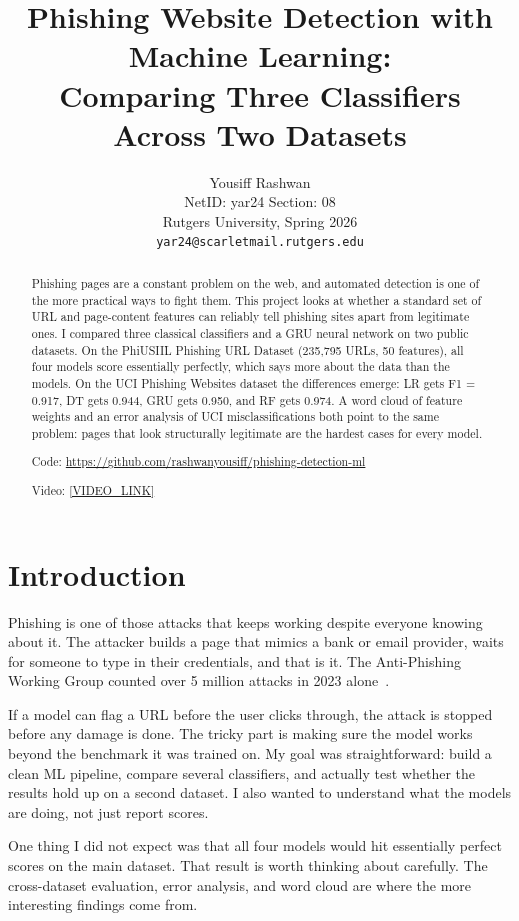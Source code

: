 \documentclass{article}
\title{Phishing Website Detection with Machine Learning:\\
Comparing Three Classifiers Across Two Datasets}
\author{%
  Yousiff Rashwan \\
  NetID: yar24 \quad Section: 08 \\
  Rutgers University, Spring 2026 \\
  \texttt{yar24@scarletmail.rutgers.edu}
}
\begin{document}
\maketitle

\begin{abstract}
Phishing pages are a constant problem on the web, and automated detection is one of the more practical ways to fight them.
This project looks at whether a standard set of URL and page-content features can reliably tell phishing sites apart from legitimate ones.
I compared three classical classifiers and a GRU neural network on two public datasets.
On the PhiUSIIL Phishing URL Dataset (235,795 URLs, 50 features), all four models score essentially perfectly, which says more about the data than the models.
On the UCI Phishing Websites dataset the differences emerge: LR gets F1 = 0.917, DT gets 0.944, GRU gets 0.950, and RF gets 0.974.
A word cloud of feature weights and an error analysis of UCI misclassifications both point to the same problem: pages that look structurally legitimate are the hardest cases for every model.

Code: \url{https://github.com/rashwanyousiff/phishing-detection-ml}

Video: \url{[VIDEO_LINK]}
\end{abstract}

\section{Introduction}

Phishing is one of those attacks that keeps working despite everyone knowing about it.
The attacker builds a page that mimics a bank or email provider, waits for someone to type in their credentials, and that is it.
The Anti-Phishing Working Group counted over 5 million attacks in 2023 alone~\cite{apwg2023}.

If a model can flag a URL before the user clicks through, the attack is stopped before any damage is done.
The tricky part is making sure the model works beyond the benchmark it was trained on.
My goal was straightforward: build a clean ML pipeline, compare several classifiers, and actually test whether the results hold up on a second dataset.
I also wanted to understand what the models are doing, not just report scores.

One thing I did not expect was that all four models would hit essentially perfect scores on the main dataset.
That result is worth thinking about carefully.
The cross-dataset evaluation, error analysis, and word cloud are where the more interesting findings come from.
\end{document}
